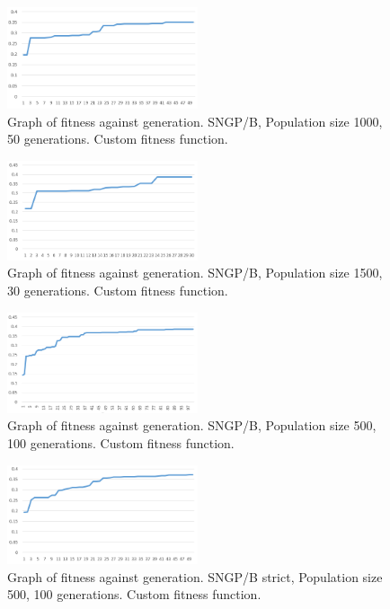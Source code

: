 \documentclass{article}
\begin{document}
    	\begin{figure}[H]
    		\centering
    		\includegraphics[width=0.5\textwidth]{g_sngpb_ff}
    		\caption{Graph of fitness against generation. SNGP/B, Population size 1000, 50 generations. Custom fitness function.}
    		\label{g:sngpb_ff}
    	\end{figure}
    
    	\begin{figure}[H]
    		\centering
    		\includegraphics[width=0.5\textwidth]{g_sngpb_ff_p1500_o30}
    		\caption{Graph of fitness against generation. SNGP/B, Population size 1500, 30 generations. Custom fitness function.}
    		\label{g:sngpb_ff_p1500}
    	\end{figure}
    
    	\begin{figure}[H]
    		\centering
    		\includegraphics[width=0.5\textwidth]{g_sngpb_ff1_p500_o100}
    		\caption{Graph of fitness against generation. SNGP/B, Population size 500, 100 generations. Custom fitness function.}
    		\label{g:sngpb_ff_p500}
    	\end{figure}
    
    	\begin{figure}[H]
    		\centering
    		\includegraphics[width=0.5\textwidth]{g_sngpb_ff_strict}
    		\caption{Graph of fitness against generation. SNGP/B strict, Population size 500, 100 generations. Custom fitness function.}
    		\label{g:sngpb_ff_strict}
    	\end{figure}
    
\end{document}
